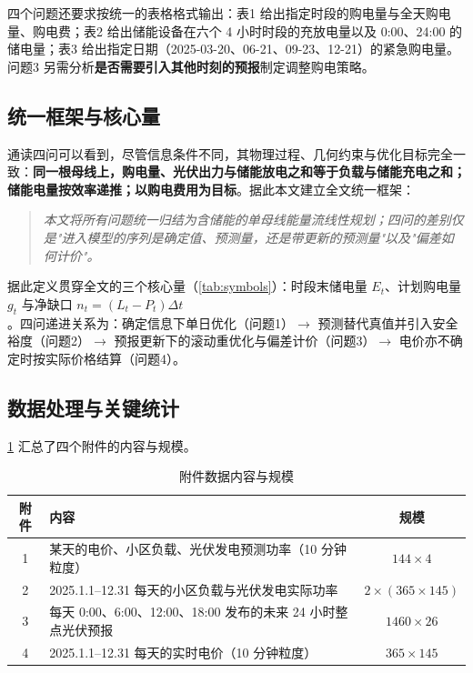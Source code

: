 四个问题还要求按统一的表格格式输出：表1 给出指定时段的购电量与全天购电量、购电费；表2 给出储能设备在六个 4 小时时段的充放电量以及 0:00、24:00 的储电量；表3 给出指定日期（2025-03-20、06-21、09-23、12-21）的紧急购电量。问题3 另需分析\textbf{是否需要引入其他时刻的预报}制定调整购电策略。

\subsection{统一框架与核心量}

通读四问可以看到，尽管信息条件不同，其物理过程、几何约束与优化目标完全一致：\textbf{同一根母线上，购电量、光伏出力与储能放电之和等于负载与储能充电之和；储能电量按效率递推；以购电费用为目标}。据此本文建立全文统一框架：

\begin{quote}
\itshape 本文将所有问题统一归结为含储能的单母线能量流线性规划；四问的差别仅是"进入模型的序列是确定值、预测量，还是带更新的预测量"以及"偏差如何计价"。
\end{quote}

据此定义贯穿全文的三个核心量（\cref{tab:symbols}）：时段末储电量 $E_t$、计划购电量 $g_t$ 与净缺口 $n_t=(L_t-P_t)\Delta t$。四问递进关系为：确定信息下单日优化（问题1）$\to$ 预测替代真值并引入安全裕度（问题2）$\to$ 预报更新下的滚动重优化与偏差计价（问题3）$\to$ 电价亦不确定时按实际价格结算（问题4）。

\subsection{数据处理与关键统计}

\cref{tab:attachments} 汇总了四个附件的内容与规模。

\begin{table}[H]
  \centering
  \caption{附件数据内容与规模}
  \label{tab:attachments}
  \small
  \begin{tabular}{clc}
    \toprule[1.5pt]
    附件 & 内容 & 规模 \\
    \midrule[1pt]
    1 & 某天的电价、小区负载、光伏发电预测功率（10 分钟粒度） & $144\times4$ \\
    2 & 2025.1.1--12.31 每天的小区负载与光伏发电实际功率 & $2\times(365\times145)$ \\
    3 & 每天 0:00、6:00、12:00、18:00 发布的未来 24 小时整点光伏预报 & $1460\times26$ \\
    4 & 2025.1.1--12.31 每天的实时电价（10 分钟粒度） & $365\times145$ \\
    \bottomrule[1.5pt]
  \end{tabular}
\end{table}

